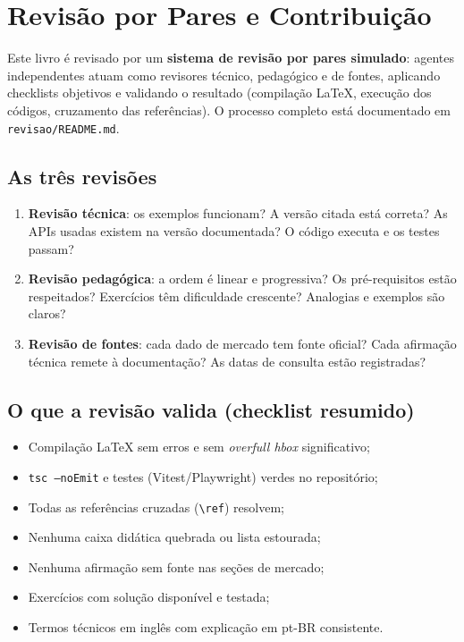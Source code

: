 \chapter{Revisão por Pares e Contribuição}
\label{apendice:revisao}

\begin{caixaconceito}
Este livro é revisado por um \textbf{sistema de revisão por pares simulado}:
agentes independentes atuam como revisores técnico, pedagógico e de fontes,
aplicando checklists objetivos e validando o resultado (compilação LaTeX,
execução dos códigos, cruzamento das referências). O processo completo está
documentado em \texttt{revisao/README.md}.
\end{caixaconceito}

\section{As três revisões}

\begin{enumerate}[leftmargin=*, itemsep=0.4em]
  \item \textbf{Revisão técnica}: os exemplos funcionam? A versão citada está
  correta? As APIs usadas existem na versão documentada? O código executa e os
  testes passam?
  \item \textbf{Revisão pedagógica}: a ordem é linear e progressiva? Os
  pré-requisitos estão respeitados? Exercícios têm dificuldade crescente?
  Analogias e exemplos são claros?
  \item \textbf{Revisão de fontes}: cada dado de mercado tem fonte oficial?
  Cada afirmação técnica remete à documentação? As datas de consulta estão
  registradas?
\end{enumerate}

\section{O que a revisão valida (checklist resumido)}

\begin{itemize}[leftmargin=*, itemsep=0.4em]
  \item Compilação LaTeX sem erros e sem \emph{overfull hbox} significativo;
  \item \texttt{tsc --noEmit} e testes (Vitest/Playwright) verdes no repositório;
  \item Todas as referências cruzadas (\texttt{\textbackslash ref}) resolvem;
  \item Nenhuma caixa didática quebrada ou lista estourada;
  \item Nenhuma afirmação sem fonte nas seções de mercado;
  \item Exercícios com solução disponível e testada;
  \item Termos técnicos em inglês com explicação em pt-BR consistente.
\end{itemize}

